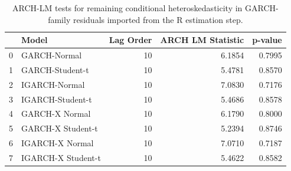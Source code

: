 \begin{table}
\caption{ARCH-LM tests for remaining conditional heteroskedasticity in GARCH-family residuals imported from the R estimation step.}
\label{tab:arch_lm_tests}
\begin{tabular}{llrrr}
\toprule
 & Model & Lag Order & ARCH LM Statistic & p-value \\
\midrule
0 & GARCH-Normal & 10 & 6.1854 & 0.7995 \\
1 & GARCH-Student-t & 10 & 5.4781 & 0.8570 \\
2 & IGARCH-Normal & 10 & 7.0830 & 0.7176 \\
3 & IGARCH-Student-t & 10 & 5.4686 & 0.8578 \\
4 & GARCH-X Normal & 10 & 6.1790 & 0.8000 \\
5 & GARCH-X Student-t & 10 & 5.2394 & 0.8746 \\
6 & IGARCH-X Normal & 10 & 7.0710 & 0.7187 \\
7 & IGARCH-X Student-t & 10 & 5.4622 & 0.8582 \\
\bottomrule
\end{tabular}
\end{table}
